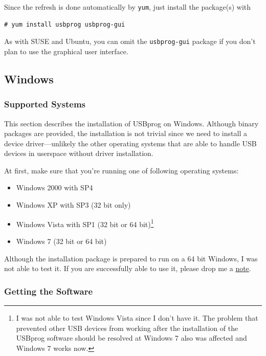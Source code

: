 \documentclass[bibtotoc,UKenglish,halfparskip,oneside,DIV12]{scrreprt}
\begin{document}
Since the refresh is done automatically by \texttt{yum}, just install the package(s) with

\begin{lstlisting}[style=inline]
# yum install usbprog usbprog-gui
\end{lstlisting}

As with SUSE and Ubuntu, you can omit the \texttt{usbprog-gui} package if you don't plan to use the
graphical user interface.


\subsection{Windows}

\subsubsection{Supported Systems}

This section describes the installation of USBprog on Windows. Although binary packages are
provided, the installation is not trivial since we need to install a device driver---unlikely the
other operating systems that are able to handle USB devices in userspace without driver
installation.

At first, make sure that you're running one of following operating systems:

\begin{itemize}
  \item Windows 2000 with SP4
  \item Windows XP with SP3 (32 bit only)
  \item Windows Vista with SP1 (32 bit or 64 bit)\footnote{I was not able to test Windows Vista since
    I don't have it. The problem that prevented other USB devices from working after the
    installation of the USBprog software should be resolved at Windows 7 also was affected and
    Windows 7 works now.}
  \item Windows 7 (32 bit or 64 bit)
\end{itemize}

Although the installation package is prepared to run on a 64 bit Windows, I was not able to test it.
If you are successfully able to use it, please drop me a \href{bernhard@bwalle.de}{note}.

\subsubsection{Getting the Software}
\end{document}
